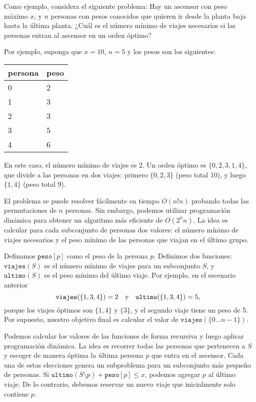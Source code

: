 Como ejemplo, considera el siguiente problema:
Hay un ascensor con peso máximo $x$,
y $n$ personas con pesos conocidos
que quieren ir desde la planta baja
hasta la última planta.
¿Cuál es el número mínimo de viajes necesarios
si las personas entran al ascensor en un orden óptimo?

Por ejemplo, suponga que $x=10$, $n=5$
y los pesos son los siguientes:
\begin{center}
    \begin{tabular}{ll}
        persona & peso \\
        \hline
        0       & 2    \\
        1       & 3    \\
        2       & 3    \\
        3       & 5    \\
        4       & 6    \\
    \end{tabular}
\end{center}
En este caso, el número mínimo de viajes es 2.
Un orden óptimo es $\{0,2,3,1,4\}$,
que divide a las personas en dos viajes:
primero $\{0,2,3\}$ (peso total 10),
y luego $\{1,4\}$ (peso total 9).

El problema se puede resolver fácilmente en tiempo $O(n! n)$
probando todas las permutaciones de $n$ personas.
Sin embargo, podemos utilizar programación dinámica para obtener
un algoritmo más eficiente de $O(2^n n)$.
La idea es calcular para cada subconjunto de personas
dos valores: el número mínimo de viajes necesarios y
el peso mínimo de las personas que viajan en el último grupo.

Definamos $\texttt{peso}[p]$ como el peso de
la persona $p$.
Definimos dos funciones:
$\texttt{viajes}(S)$ es el número mínimo de
viajes para un subconjunto $S$,
y $\texttt{ultimo}(S)$ es el peso mínimo
del último viaje.
Por ejemplo, en el escenario anterior
\[ \texttt{viajes}(\{1,3,4\})=2 \hspace{10px} \textrm{y}
    \hspace{10px} \texttt{ultimo}(\{1,3,4\})=5,\]
porque los viajes óptimos son $\{1,4\}$ y $\{3\}$,
y el segundo viaje tiene un peso de 5.
Por supuesto, nuestro objetivo final es calcular el valor
de $\texttt{viajes}(\{0 \ldots n-1\})$.

Podemos calcular los valores
de las funciones de forma recursiva y luego aplicar
programación dinámica.
La idea es recorrer todas las personas
que pertenecen a $S$ y escoger de manera óptima
la última persona $p$ que entra en el ascensor.
Cada una de estas elecciones genera un subproblema
para un subconjunto más pequeño de personas.
Si $\texttt{ultimo}(S \setminus p)+\texttt{peso}[p] \le x$,
podemos agregar $p$ al último viaje.
De lo contrario, debemos reservar un nuevo viaje
que inicialmente solo contiene $p$.

